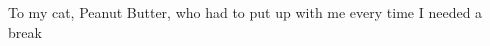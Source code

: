 \leavevmode\vfill
\begin{center}
To my cat, Peanut Butter, who had to put up with me every time I needed a break
\end{center}
\vfill